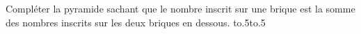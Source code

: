 \documentclass[exercice]{thedocument}%
\begin{document}
%
Compléter la pyramide sachant que le nombre inscrit sur une brique est la somme
des nombres inscrits sur les deux briques en dessous.\vskip10pt\noindent
\hbox{\hbox to.5\linewidth{\<pyramide1;\hfill}\hbox to.5\linewidth{\<pyramide2;\hfill}}
\end{document}
